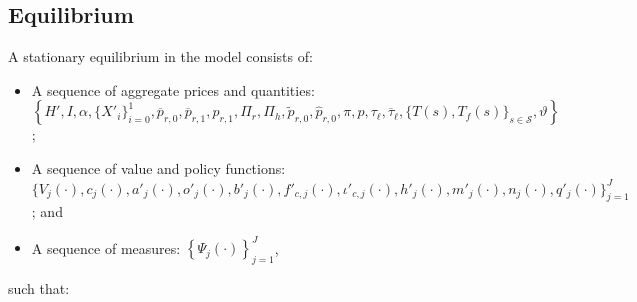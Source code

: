 \documentclass[parskip=full]{article}
\begin{document}
\subsection{Equilibrium}
A stationary equilibrium in the model consists of: 
\begin{itemize}
   \item A sequence of aggregate prices and quantities:\\   
    $\left\{H', I, \alpha, \{X'_{i}\}_{i=0}^{1},    \overline{p}_{r,0},\overline{p}_{r,1}, p_{r,1}, \Pi_r, \Pi_h, \tilde{p}_{r,0}, \hat{p}_{r,0}, \pi, p, \tau_{\ell}, \overline{\tau}_{\ell}, \{T(s), T_f(s)\}_{s \in \mathcal{S}}, \vartheta \right\}$;
    \item A sequence of value and policy functions: \\
    $\biggl\{V_{j}(\cdot),c_{j}(\cdot),a'_{j}(\cdot),o'_{j}(\cdot),b'_{j}(\cdot),f'_{c,j}(\cdot),\iota'_{c,j}(\cdot),h'_{j}(\cdot),m'_{j}(\cdot),n_{j}(\cdot),q'_{j}(\cdot)\biggl\}_{j=1}^J$; and
    \item A sequence of measures: 
     $\left\{\Psi_{j}(\cdot)\right\}_{j=1}^J$,
\end{itemize}
\noindent such that:
\end{document}
